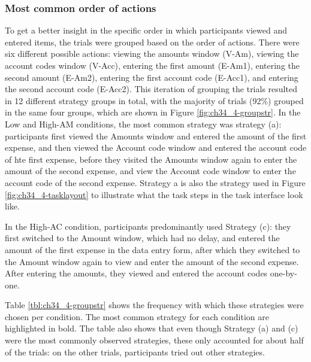 \subsubsection{Most common order of actions}\label{sec:ch34-StrategyFreq}
To get a better insight in the specific order in which participants viewed and entered items, the trials were grouped based on the order of actions. There were six different possible actions: viewing the amounts window (V-Am), viewing the account codes window (V-Acc), entering the first amount (E-Am1), entering the second amount (E-Am2), entering the first account code (E-Acc1), and entering the second account code (E-Acc2). This iteration of grouping the trials resulted in 12 different strategy groups in total, with the majority of trials (92\%) grouped in the same four groups, which are shown in Figure \ref{fig:ch34_4-groupstr}. In the Low and High-AM conditions, the most common strategy was strategy (a): participants first viewed the Amounts window and entered the amount of the first expense, and then viewed the Account code window and entered the account code of hte first expense, before they visited the Amounts window again to enter the amount of the second expense, and view the Account code window to enter the account code of the second expense. Strategy a is also the strategy used in Figure \ref{fig:ch34_4-tasklayout} to illustrate what the task steps in the task interface look like.

In the High-AC condition, participants predominantly used Strategy (c): they first switched to the Amount window, which had no delay, and entered the amount of the first expense in the data entry form, after which they switched to the Amount window again to view and enter the amount of the second expense. After entering the amounts, they viewed and entered the account codes one-by-one.

Table \ref{tbl:ch34_4-groupstr} shows the frequency with which these strategies were chosen per condition. The most common strategy for each condition are highlighted in bold. The table also shows that even though Strategy (a) and (c) were the most commonly observed strategies, these only accounted for about half of the trials: on the other  trials, participants tried out other strategies.  



